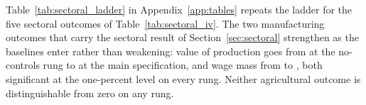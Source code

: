 Table~\ref{tab:sectoral_ladder} in Appendix~\ref{app:tables} repeats
the ladder for the five sectoral outcomes of
Table~\ref{tab:sectoral_iv}. The two manufacturing outcomes that carry
the sectoral result of Section~\ref{sec:sectoral} strengthen as the
baselines enter rather than weakening: value of production goes from
\ladderValprodLo{} at the no-controls rung to \ladderValprodHi{} at the
main specification, and wage mass from \ladderMassalLo{} to
\ladderMassalHi{}, both significant at the one-percent level on every
rung. Neither agricultural outcome is distinguishable from zero on any
rung.


